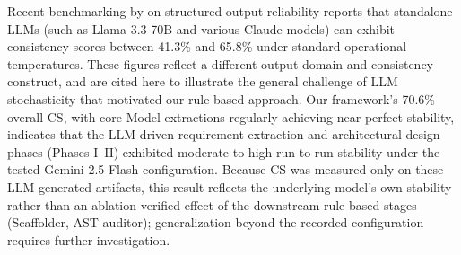 Recent benchmarking by \cite{wang2025sted} on structured output reliability reports that standalone LLMs (such as Llama-3.3-70B and various Claude models) can exhibit consistency scores between 41.3\% and 65.8\% under standard operational temperatures. These figures reflect a different output domain and consistency construct, and are cited here to illustrate the general challenge of LLM stochasticity that motivated our rule-based approach. Our framework's 70.6\% overall CS, with core Model extractions regularly achieving near-perfect stability, indicates that the LLM-driven requirement-extraction and architectural-design phases (Phases I–II) exhibited moderate-to-high run-to-run stability under the tested Gemini 2.5 Flash configuration. Because CS was measured only on these LLM-generated artifacts, this result reflects the underlying model's own stability rather than an ablation-verified effect of the downstream rule-based stages (Scaffolder, AST auditor); generalization beyond the recorded configuration requires further investigation.
